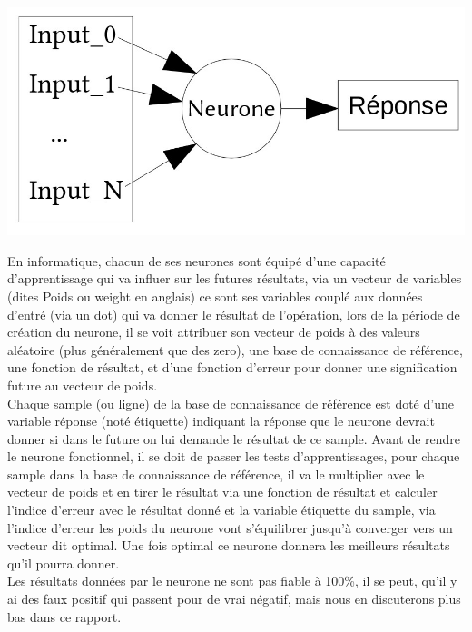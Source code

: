 \begin{center}
\includegraphics[scale=0.3]{img/neurone.jpg} 
\end{center}

En informatique, chacun de ses neurones sont équipé d'une capacité d'apprentissage qui va influer sur les futures résultats, via un vecteur de variables (dites Poids ou weight en anglais) ce sont ses variables couplé aux données d'entré (via un dot) qui va donner le résultat de l'opération, lors de la période de création du neurone, il se voit attribuer son vecteur de poids à des valeurs aléatoire (plus généralement que des zero), une base de connaissance de référence,  une fonction de résultat, et d'une fonction d'erreur pour donner une signification future au vecteur de poids.\\
\linebreak
Chaque sample (ou ligne) de la base de connaissance de référence est doté d'une variable réponse (noté étiquette) indiquant la réponse que le neurone devrait donner si dans le future on lui demande le résultat de ce sample. Avant de rendre le neurone fonctionnel, il se doit de passer les tests d'apprentissages, pour chaque sample dans la base de connaissance de référence, il va le multiplier avec le vecteur de poids et en tirer le résultat via une fonction de résultat et calculer l'indice d'erreur avec le résultat donné et la variable étiquette du sample, via l'indice d'erreur les poids du neurone vont s'équilibrer jusqu'à converger vers un vecteur dit optimal. Une fois optimal ce neurone donnera les meilleurs résultats qu'il pourra donner.\\
\linebreak
Les résultats données par le neurone ne sont pas fiable à 100\%, il se peut, qu'il y ai des faux positif qui passent pour de vrai négatif, mais nous en discuterons plus bas dans ce rapport.

\pagebreak

